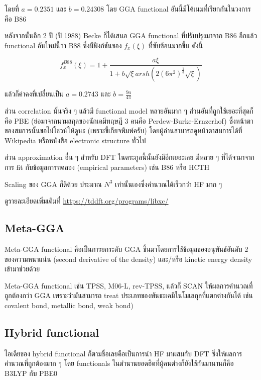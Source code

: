 \noindent โดยที่ $a = 0.2351$ และ $b = 0.24308$ โดย GGA functional อันนี้มีโค้เนมที่เรียกกันในวงการคือ B86

หลังจากนั้นอีก 2 ปี (ปี 1988) Becke ก็ได้เสนอ GGA functional ที่ปรับปรุงมาจาก B86 อีกแล้ว functional
อันใหม่นี้ว่า B88 ซึ่งมีฟังก์ชันของ $f_{x}(\xi)$ ที่ซับซ้อนมากขึ้น ดังนี้ 

\begin{equation}
    f^{B88}_{x}(\xi) = 
    1 + \frac{a\xi}{1 + b\sqrt{\xi} arsh (2(6\pi^{2})^{\frac{1}{3}} \sqrt{\xi })}
\end{equation}

\noindent แล้วก็ค่าคงที่เปลี่ยนเป็น $a = 0.2743$ และ $b = \frac{9a}{4\pi}$

ส่วน correlation นั้นจริง ๆ แล้วมี functional model หลายอันมาก ๆ ส่วนอันที่ถูกใช้เยอะที่สุดก็คือ PBE 
(ย่อมาจากนามสกุลของนักเคมีทฤษฎี 3 คนคือ Perdew-Burke-Ernzerhof) ซึ่งหน้าตาของสมการนั้นขอไม่โชวน์ให้ดูนะ
(เพราะขี้เกียจพิมพ์ครับ) โดยผู้อ่านสามารถดูหน้าตาสมการได้ที่ Wikipedia หรือหนังสือ electronic structure ทั่วไป 

ส่วน approximation อื่น ๆ สำหรับ DFT ในตระกูลนี้นั้นยังมีอีกเยอะเลย มีหลาย ๆ ที่ได้จามาจากการ fit กับข้อมูลการทดลอง 
(empirical parameters) เช่น B86 หรือ HCTH 

Scaling ของ GGA ก็ดีด้วย ประมาณ $N^{3}$ เท่านั้นเองซึ่งคำนวณได้เร็วกว่า HF มาก ๆ

ดูรายละเอียดเพิ่มเติมที่ \url{https://tddft.org/programs/libxc/}

\subsection{Meta-GGA}

Meta-GGA functional คือเป็นการยกระดับ GGA ขึ้นมาโดยการใช้ข้อมูลของอนุพันธ์อันดับ 2 ของความหนาแน่น (second 
derivative of the density) และ/หรือ kinetic energy density เข้ามาช่วยด้วย 

Meta-GGA functional เช่น TPSS, M06-L, rev-TPSS, แล้วก็ SCAN ให้ผลการคำนวณที่ถูกต้องกว่า GGA 
เพราะว่ามันสามารถ treat ประเภทของพันธะเคมีในโมเลกุลที่แตกต่างกันได้ เช่น covalent bond, metallic bond, 
weak bond) 

\subsection{Hybrid functional}

ไอเดียของ hybrid functional ก็ตามชื่อเลยคือเป็นการนำ HF มาผสมกับ DFT ซึ่งให้ผลการคำนวณที่ถูกต้องมาก ๆ 
โดย functionals ในตำนานยอดฮิตที่ผู้คนต่างก็ยังใช้กันมานานก็คือ B3LYP กับ PBE0 

